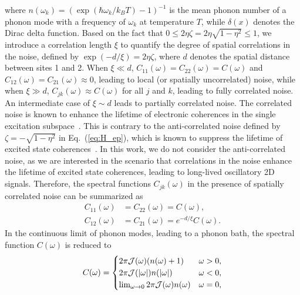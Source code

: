 \documentclass[%
 reprint,%
 amssymb, amsmath,%
 aip,cha,%
]{revtex4-1}
\newcommand{\abs}[1]{\left|#1\right|}
\begin{document}
 where $n(\omega_k)=(\exp(\hbar\omega_k/k_B T)-1)^{-1}$ is the mean phonon number of a phonon mode with a frequency of $\omega_k$ at temperature $T$, while $\delta(x)$ denotes the Dirac delta function. Based on the fact that $0\le 2\eta\zeta=2\eta\sqrt{1-\eta^2}\le 1$, we introduce a correlation length $\xi$ to quantify the degree of spatial correlations in the noise, defined by $\exp(-d/\xi)=2\eta\zeta$, where $d$ denotes the spatial distance between sites 1 and 2. When $\xi\ll d$, $C_{11}(\omega)=C_{22}(\omega)=C(\omega)$ and $C_{12}(\omega)=C_{21}(\omega)\approx 0$, leading to local (or spatially uncorrelated) noise, while when $\xi\gg d$, $C_{jk}(\omega)\approx C(\omega)$ for all $j$ and $k$, leading to fully correlated noise. An intermediate case of $\xi\sim d$ leads to partially correlated noise. The correlated noise is known to enhance the lifetime of electronic coherences in the single excitation subspace~\cite{NalbachNJP2010,IshizakiNJP2010,ChenJCP2010,McCutcheonPRB2011,LimNJP2014,JeskeJCP2015,AbramaviciusJCP2011}. This is contrary to the anti-correlated noise defined by $\zeta=-\sqrt{1-\eta^2}$ in Eq.~(\ref{eq:H_ep}), which is known to suppress the lifetime of excited state coherences~\cite{IshizakiNJP2010,LimNJP2014}. In this work, we do not consider the anti-correlated noise, as we are interested in the scenario that correlations in the noise enhance the lifetime of excited state coherences, leading to long-lived oscillatory 2D signals. Therefore, the spectral functions $C_{jk}(\omega)$ in the presence of spatially correlated noise can be summarized as
 \begin{align}
 C_{11}(\omega)&=C_{22}(\omega)=C(\omega),\\
 C_{12}(\omega)&=C_{21}(\omega)=e^{-d/\xi} C(\omega).
 \end{align}
 In the continuous limit of phonon modes, leading to a phonon bath, the spectral function $C(\omega)$ is reduced to
 \begin{equation}
 C(\omega)=
 \begin{cases}
 2\pi{\cal J(\omega)}(n(\omega)+1) & \omega> 0,\\
 2\pi{\cal J(\abs{\omega})}n(\abs{\omega}) & \omega< 0,\\
 \lim_{\omega\rightarrow 0}2\pi{\cal J(\omega)}n(\omega) & \omega=0,\label{eq:dep_rxn}
 \end{cases}
 \end{equation}
\end{document}
